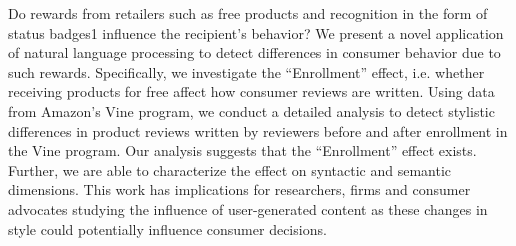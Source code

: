 Do rewards from retailers such as free products and recognition in the form of status badges1 influence the recipient's behavior? We present a novel application of natural language processing to detect differences in consumer behavior due to such rewards. Specifically, we investigate the ``Enrollment'' effect, i.e. whether receiving products for free affect how consumer reviews are written. Using data from Amazon's Vine program, we conduct a detailed analysis to detect stylistic differences in product reviews written by reviewers before and after enrollment in the Vine program. Our analysis suggests that the ``Enrollment'' effect exists. Further, we are able to characterize the effect on syntactic and semantic dimensions. This work has implications for researchers, firms and consumer advocates studying the influence of user-generated content as these changes in style could potentially influence consumer decisions.
